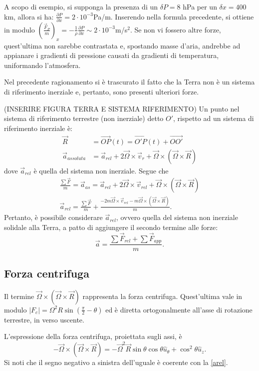 A scopo di esempio, si supponga la presenza di un $\delta P = 8$ hPa per un $\delta x=400$km, allora si ha: $\frac{\partial P}{\partial x}=2\cdot10^{-3}$Pa/m. Inserendo nella formula precedente, si ottiene in modulo $\left(\frac{\vec{F}_P}{m}\right)_x = -\frac{1}{\rho}\frac{\partial P}{\partial x}\sim 2\cdot 10^{-3}$m/s$^2$. Se non vi fossero altre forze, quest'ultima non sarebbe contrastata e, spostando masse d'aria, andrebbe ad appianare i gradienti di pressione causati da gradienti di temperatura, uniformando l'atmosfera. 

Nel precedente ragionamento si è trascurato il fatto che la Terra non è un sistema di riferimento inerziale e, pertanto, sono presenti ulteriori forze.

(INSERIRE FIGURA TERRA E SISTEMA RIFERIMENTO)
Un punto nel sistema di riferimento terrestre (non inerziale) detto $O'$, rispetto ad un sistema di riferimento inerziale è:
\begin{align}
	\vec{R}&=\vec{OP}(t)=\vec{O'P}(t)+\vec{OO'}\\
	\vec{a}_{assoluta}&=\vec{a}_{rel}+2\vec{\Omega}\times\vec{v}_r+\vec{\Omega}\times(\vec{\Omega}\times\vec{R})
\end{align}
dove $\vec{a}_{rel}$ è quella del sistema non inerziale. Segue che
\begin{align}
	\frac{\sum \vec{F}}{m}=\vec{a}_{as}=\vec{a}_{rel}+2\vec{\Omega}\times\vec{v}_{rel}+\vec{\Omega}\times(\vec{\Omega}\times\vec{R})\\
	\vec{a}_{rel}=\frac{\sum \vec{F}}{m}+\frac{-2m\vec{\Omega}\times\vec{v}_{rel}-m\vec{\Omega}\times(\vec{\Omega}\times\vec{R})}{m}\label{arel}.
\end{align}
Pertanto, è possibile considerare $\vec{a}_{rel}$, ovvero quella del sistema non inerziale solidale alla Terra, a patto di aggiungere il secondo termine alle forze:
\begin{equation}
	\vec{a}=\frac{\sum\vec{F}_{rel}+\sum\vec{F}_{app}}{m}.
\end{equation}
\subsection{Forza centrifuga}
Il termine $\vec{\Omega}\times(\vec{\Omega}\times\vec{R})$ rappresenta la forza centrifuga. Quest'ultima vale in modulo  $|F_c|=\Omega^2 R\sin(\frac{\pi}{2}-\theta)$ ed è diretta ortogonalmente all'asse di rotazione terrestre, in verso uscente.

L'espressione della forza centrifuga, proiettata sugli assi, è
\begin{equation}\label{scomp_fc}
	-\vec{\Omega}\times(\vec{\Omega}\times\vec{R})=-\vec{\Omega}^2\vec{R}\sin\theta\cos\theta\hat{u}_\theta+\cos^2\theta\hat{u}_z.
\end{equation}
Si noti che il segno negativo a sinistra dell'uguale è coerente con la \eqref{arel}.

